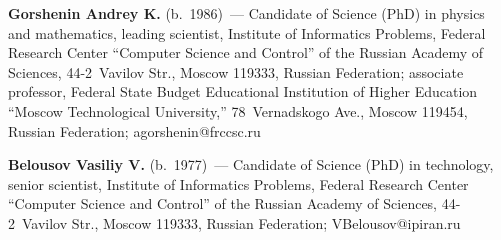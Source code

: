  \vspace*{3pt}
 
 \noindent
\textbf{Gorshenin Andrey K.}  (b.\ 1986)~---
Candidate of Science (PhD) in physics and mathematics, leading scientist, 
Institute of Informatics Problems, Federal Research Center ``Computer Science 
and Control'' of the Russian Academy of Sciences, 44-2~Vavilov Str., Moscow 119333, 
Russian Federation; associate professor, Federal State Budget Educational 
Institution of Higher Education ``Moscow Technological University,'' 
78~Vernadskogo Ave., Moscow 119454, Russian Federation;
\mbox{agorshenin@frccsc.ru}

\vspace*{3pt}

\noindent
\textbf{Belousov Vasiliy V.} (b.\ 1977)~---
Candidate of Science (PhD) in technology, senior scientist, Institute of 
Informatics Problems, Federal Research Center ``Computer Science and Control'' 
of the Russian Academy of Sciences, 44-2~Vavilov Str., Moscow 119333, Russian 
Federation; \mbox{VBelousov@ipiran.ru}
\label{end\stat}


\renewcommand{\bibname}{\protect\rm Литература} 